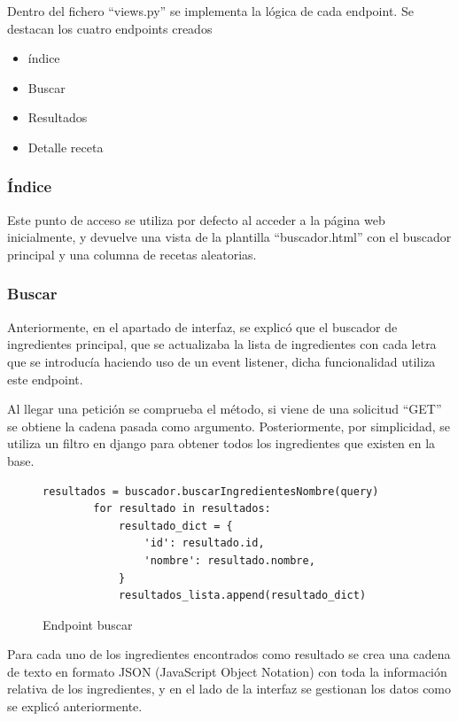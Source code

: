 \newpage
Dentro del fichero ``views.py'' se implementa la lógica de cada \gls{endpoint}. Se destacan los cuatro \glspl{endpoint} creados
\begin{itemize}
    \item índice
    \item Buscar
    \item Resultados
    \item Detalle receta
\end{itemize}

\subsubsection{Índice}
Este punto de acceso se utiliza por defecto al acceder a la página web inicialmente, y devuelve una vista de la plantilla ``buscador.html'' con el buscador principal y una columna de recetas aleatorias. 

\subsubsection{Buscar}
Anteriormente, en el apartado de interfaz, se explicó que el buscador de ingredientes principal, que se actualizaba la lista de ingredientes con cada letra que se introducía haciendo uso de un \gls{event listener}, dicha funcionalidad utiliza este \gls{endpoint}.

Al llegar una petición se comprueba el método, si viene de una solicitud ``GET'' se obtiene la cadena pasada como argumento. Posteriormente, por simplicidad, se utiliza un filtro en \gls{django} para obtener todos los ingredientes que existen en la \gls{base}. 
\begin{figure}
    \centering
    \begin{lstlisting}[style=consola]
        resultados = buscador.buscarIngredientesNombre(query)
        for resultado in resultados:
            resultado_dict = {
                'id': resultado.id,
                'nombre': resultado.nombre,
            }
            resultados_lista.append(resultado_dict)
    \end{lstlisting}
    \caption{Endpoint buscar}
    \label{sni:Buscar}
\end{figure}
Para cada uno de los ingredientes encontrados como resultado se crea una cadena de texto en formato \gls{JSON} (JavaScript Object Notation) con toda la información relativa de los ingredientes, y en el lado de la \gls{interfaz} se gestionan los datos como se explicó anteriormente.

